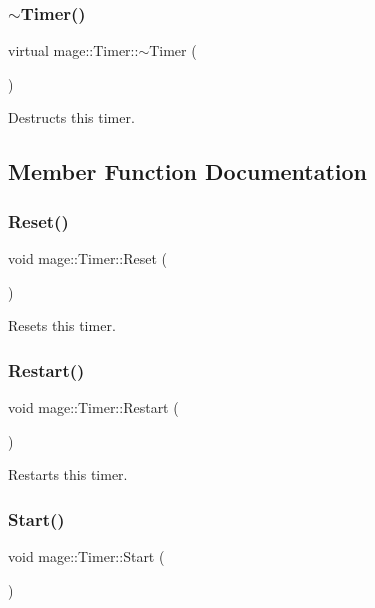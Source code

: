 \subsubsection{\texorpdfstring{$\sim$\+Timer()}{~Timer()}}
{\footnotesize\ttfamily virtual mage\+::\+Timer\+::$\sim$\+Timer (\begin{DoxyParamCaption}{ }\end{DoxyParamCaption})\hspace{0.3cm}{\ttfamily [virtual]}}

Destructs this timer. 

\subsection{Member Function Documentation}
\hypertarget{classmage_1_1_timer_a0675ff7bc0a8e7343b5a35f865cc9c1a}{}\label{classmage_1_1_timer_a0675ff7bc0a8e7343b5a35f865cc9c1a} 
\subsubsection{\texorpdfstring{Reset()}{Reset()}}
{\footnotesize\ttfamily void mage\+::\+Timer\+::\+Reset (\begin{DoxyParamCaption}{ }\end{DoxyParamCaption})}

Resets this timer. \hypertarget{classmage_1_1_timer_a4e1ba19d02c290a18981db1766f006c3}{}\label{classmage_1_1_timer_a4e1ba19d02c290a18981db1766f006c3} 
\subsubsection{\texorpdfstring{Restart()}{Restart()}}
{\footnotesize\ttfamily void mage\+::\+Timer\+::\+Restart (\begin{DoxyParamCaption}{ }\end{DoxyParamCaption})}

Restarts this timer. \hypertarget{classmage_1_1_timer_a5855c9df8ad1a2b6774942e566833647}{}\label{classmage_1_1_timer_a5855c9df8ad1a2b6774942e566833647} 
\subsubsection{\texorpdfstring{Start()}{Start()}}
{\footnotesize\ttfamily void mage\+::\+Timer\+::\+Start (\begin{DoxyParamCaption}{ }\end{DoxyParamCaption})}

